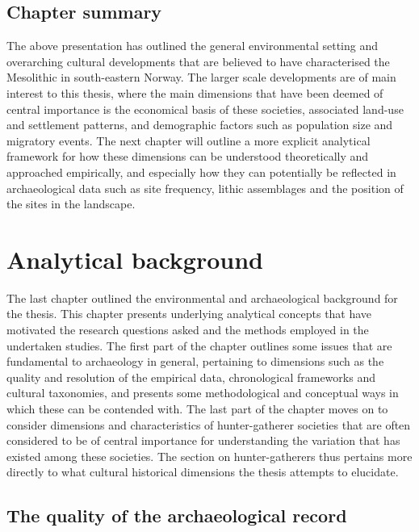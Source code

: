 \documentclass[
  12pt,
  a4paper,
  oneside]{book}
\begin{document}
\hypertarget{chapter-summary}{%
\section{Chapter summary}\label{chapter-summary}}

The above presentation has outlined the general environmental setting and overarching cultural developments that are believed to have characterised the Mesolithic in south-eastern Norway. The larger scale developments are of main interest to this thesis, where the main dimensions that have been deemed of central importance is the economical basis of these societies, associated land-use and settlement patterns, and demographic factors such as population size and migratory events. The next chapter will outline a more explicit analytical framework for how these dimensions can be understood theoretically and approached empirically, and especially how they can potentially be reflected in archaeological data such as site frequency, lithic assemblages and the position of the sites in the landscape.

\hypertarget{chapter3}{%
\chapter{Analytical background}\label{chapter3}}

The last chapter outlined the environmental and archaeological background for the thesis. This chapter presents underlying analytical concepts that have motivated the research questions asked and the methods employed in the undertaken studies. The first part of the chapter outlines some issues that are fundamental to archaeology in general, pertaining to dimensions such as the quality and resolution of the empirical data, chronological frameworks and cultural taxonomies, and presents some methodological and conceptual ways in which these can be contended with. The last part of the chapter moves on to consider dimensions and characteristics of hunter-gatherer societies that are often considered to be of central importance for understanding the variation that has existed among these societies. The section on hunter-gatherers thus pertains more directly to what cultural historical dimensions the thesis attempts to elucidate.

\hypertarget{the-quality-of-the-archaeological-record}{%
\section{The quality of the archaeological record}\label{the-quality-of-the-archaeological-record}}
\end{document}
